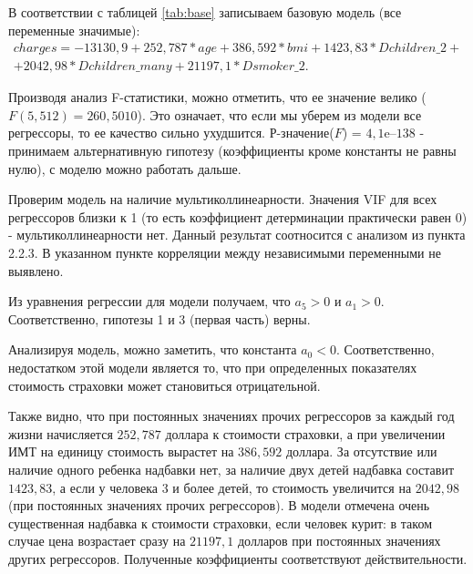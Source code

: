 \documentclass[a4paper,12pt]{article}
\begin{document}
В соответствии с таблицей \ref{tab:base} записываем базовую модель (все переменные значимые):
\begin{align*}
charges = -13130,9 + 252,787 * age + 386,592 * bmi + 1423,83 * Dchildren\_2 + \\ + 2042,98 * Dchildren\_many + 21197,1 * Dsmoker\_2.
\end{align*}

Производя анализ F-статистики, можно отметить, что ее значение велико ($F(5, 512) = 260,5010$). Это означает, что если мы уберем из модели все регрессоры, то ее качество сильно ухудшится. Р-значение($F$) = $4,1\textrm{e--138}$ - принимаем альтернативную гипотезу (коэффициенты кроме константы не равны нулю), с моделю можно работать дальше.

Проверим модель на наличие мультиколлинеарности. Значения VIF для всех регрессоров близки к 1 (то есть коэффициент детерминации практически равен 0) - мультиколлинеарности нет. Данный результат соотносится с анализом из пункта 2.2.3. В указанном пункте корреляции между независимыми переменными не выявлено.

Из уравнения регрессии для модели получаем, что $a_5 > 0$ и $a_1 > 0$. Соответственно, гипотезы 1 и 3 (первая часть) верны.

Анализируя модель, можно заметить, что константа $a_0 < 0$. Соответственно, недостатком этой модели является то, что при определенных показателях стоимость страховки может становиться отрицательной.

Также видно, что при постоянных значениях прочих регрессоров за каждый год жизни начисляется $252,787$ доллара к стоимости страховки, а при увеличении ИМТ на единицу стоимость вырастет на $386,592$ доллара. За отсутствие или наличие одного ребенка надбавки нет, за наличие двух детей надбавка составит $1423,83$, а если у человека 3 и более детей, то стоимость увеличится на $2042,98$ (при постоянных значениях прочих регрессоров). В модели отмечена очень существенная надбавка к стоимости страховки, если человек курит: в таком случае цена возрастает сразу на $21197,1$ долларов при постоянных значениях других регрессоров. Полученные коэффициенты соответствуют действительности.
\end{document}
